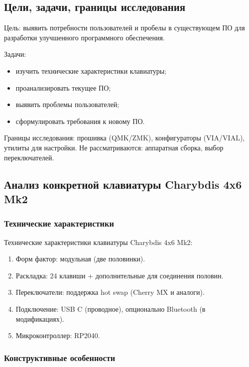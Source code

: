 \subsection{Цели, задачи, границы исследования}

Цель: выявить потребности пользователей и пробелы в существующем ПО для разработки улучшенного программного обеспечения.

Задачи:

\begin{itemize}
\item изучить технические характеристики клавиатуры;
\item проанализировать текущее ПО;
\item выявить проблемы пользователей;
\item сформулировать требования к новому ПО.
\end{itemize}

Границы исследования: прошивка (QMK/ZMK), конфигураторы (VIA/VIAL), утилиты для настройки. Не рассматриваются: аппаратная сборка, выбор переключателей.

\subsection{Анализ конкретной клавиатуры Charybdis 4x6 Mk2}

\subsubsection{Технические характеристики}

Технические характеристики клавиатуры Charybdis 4x6 Mk2:

\begin{enumerate}
\item Форм фактор: модульная (две половинки).
\item Раскладка: 24 клавиши + дополнительные для соединения половин.
\item Переключатели: поддержка hot swap (Cherry MX и аналоги).
\item Подключение: USB C (проводное), опционально Bluetooth (в модификациях).
\item Микроконтроллер: RP2040.
\end{enumerate}

\subsubsection{Конструктивные особенности}

